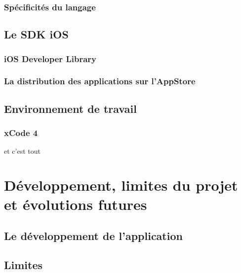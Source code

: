\documentclass[11pt, french]{report}
\begin{document}
\subsection{Spécificités du langage}


\section{Le SDK iOS}

\subsection{iOS Developer Library}


\subsection{La distribution des applications sur l’AppStore}


\section{Environnement de travail}

\subsection{xCode 4}

et c’est tout





\chapter{Développement, limites du projet et évolutions futures}

\section{Le développement de l’application}







\section{Limites}
\end{document}
